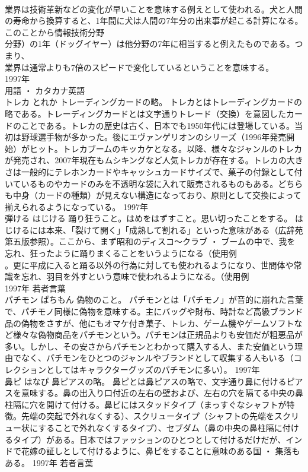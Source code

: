 \documentclass[8pt]{extreport}
\begin{document}
\begin{CJK}{UTF8}{min}
\\	業界は技術革新などの変化が早いことを意味する例えとして使われる。犬と人間の寿命から換算すると、1年間に犬は人間の7年分の出来事が起こる計算になる。このことから情報技術分野
\\	分野）の1年（ドッグイヤー）は他分野の7年に相当すると例えたものである。つまり、
\\	業界は通常よりも7倍のスピードで変化しているということを意味する。
\\	1997年	
\\	用語 ・ カタカナ英語	
\\	トレカ	とれか	トレーディングカードの略。	トレカとはトレーディングカードの略である。トレーディングカードとは文字通りトレード（交換）を意図したカードのことである。トレカの歴史は古く、日本でも1950年代には登場している。当初は野球選手物が多かった。後にエヴァンゲリオンのシリーズ（1996年発売開始）がヒット。トレカブームのキッカケとなる。以降、様々なジャンルのトレカが発売され、2007年現在もムシキングなど人気トレカが存在する。トレカの大きさは一般的にテレホンカードやキャッシュカードサイズで、菓子の付録として付いているものやカードのみを不透明な袋に入れて販売されるものもある。どちらも中身（カードの種類）が見えない構造になっており、原則として交換によって揃えられるようになっている。	1997年	
\\	弾ける	はじける	踊り狂うこと。はめをはずすこと。思い切ったことをする。	はじけるには本来、「裂けて開く」「成熟して割れる」といった意味がある（広辞苑第五版参照）。ここから、まず昭和のディスコ～クラブ ・ ブームの中で、我を忘れ、狂ったように踊りまくることをいうようになる（使用例
\\	。更に平成に入ると踊る以外の行為に対しても使われるようになり、世間体や常識を忘れ、羽目を外すという意味で使われるようになる。（使用例
\\	1997年	若者言葉	
\\	パチモン	ぱちもん	偽物のこと。	パチモンとは「パチモノ」が音的に崩れた言葉で、パチモノ同様に偽物を意味する。主にバッグや財布、時計など高級ブランド品の偽物をさすが、他にもオマケ付き菓子、トレカ、ゲーム機やゲームソフトなど様々な偽物商品をパチモンという。パチモンは正規品よりも安価だが粗悪品が多い。しかし、その安さからパチモンとわかって購入する人、また安価という理由でなく、パチモンをひとつのジャンルやブランドとして収集する人もいる（コレクションとしてはキャラクターグッズのパチモンに多い）。	1997年	
\\	鼻ピ	はなぴ	鼻ピアスの略。	鼻ピとは鼻ピアスの略で、文字通り鼻に付けるピアスを意味する。鼻の出入り口付近の左右の壁および、左右の穴を隔てる中央の鼻柱隔に穴を開けて付ける。鼻ピにはスタッドタイプ（まっすぐなシャフトが特徴。先端の突起で外れなくする）、スクリュータイプ（シャフトの先端をスクリュー状にすることで外れなくするタイプ）、セブダム（鼻の中央の鼻柱隔に付けるタイプ）がある。日本ではファッションのひとつとして付けるだけだが、インドで花嫁の証しとして付けるように、鼻ピをすることに意味のある国 ・ 集落もある。	1997年	若者言葉	

\end{CJK}
\end{document}
